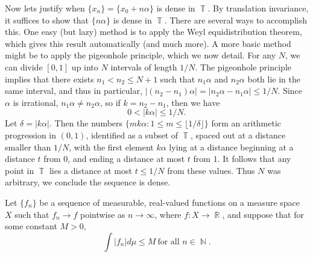 \documentclass[answers]{exam}
\DeclareMathOperator{\RR}{\mathbb{R}}
\DeclareMathOperator{\TT}{\mathbb{T}}
\DeclareMathOperator{\NN}{\mathbb{N}}
\DeclareMathOperator{\II}{\mathbb{I}}
\begin{document}
\begin{questions}
\begin{solution}
	Now lets justify when $\{ x_n \} = \{ x_0 + n \alpha \}$ is dense in $\TT$. By translation invariance, it suffices to show that $\{ n \alpha \}$ is dense in $\TT$. There are several ways to accomplish this. One easy (but lazy) method is to apply the Weyl equidistribution theorem, which gives this result automatically (and much more). A more basic method might be to apply the pigeonhole principle, which we now detail. For any $N$, we can divide $[0,1]$ up into $N$ intervals of length $1/N$. The pigeonhole principle implies that there exists $n_1 < n_2 \leq N + 1$ such that $n_1 \alpha$ and $n_2 \alpha$ both lie in the same interval, and thus in particular, $|(n_2 - n_1) \alpha| = |n_2 \alpha - n_1 \alpha| \leq 1/N$. Since $\alpha$ is irrational, $n_1 \alpha \neq n_2 \alpha$, so if $k = n_2 - n_1$, then we have
	\[ 0 < |k \alpha| \leq 1/N. \]
	Let $\delta = |k \alpha|$. Then the numbers $\{ m k\alpha : 1 \leq m \leq \lfloor 1/\delta \rfloor \}$ form an arithmetic progression in $(0,1)$, identified as a subset of $\TT$, spaced out at a distance smaller than $1/N$, with the first element $k \alpha$ lying at a distance beginning at a distance $t$ from $0$, and ending a distance at most $t$ from $1$. It follows that any point in $\TT$ lies a distance at most $t \leq 1/N$ from these values. Thus $N$ was arbitrary, we conclude the sequence is dense.
\end{solution}

\question Let $\{ f_n \}$ be a sequence of measurable, real-valued functions on a measure space $X$ such that $f_n \to f$ pointwise as $n \to \infty$, where $f: X \to \RR$, and suppose that for some constant $M > 0$,
%
\[ \int |f_n| d\mu \leq M\ \text{for all $n \in \NN$}. \]
\end{questions}
\end{document}
